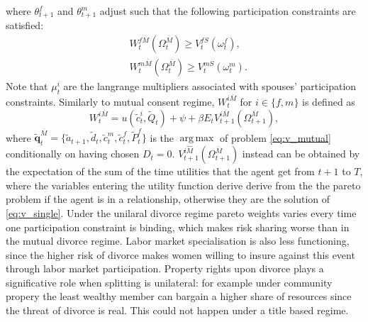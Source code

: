 \documentclass[12pt]{article}
\numberwithin{table}{section}
\DeclareMathOperator*{\argmax}{arg\,max}
\begin{document}
where $\theta^f_{t+1}$ and $\theta^m_{t+1}$ adjust such that the following participation constraints are satisfied:
\begin{equation}\label{eq:p_cons_mar}
\begin{split}
&
W^{f\overline{M}}_{t}(\Omega^{\overline{M}}_{t})\geq V_{t}^{fS}(\omega^f_{t}),\\ &
W^{m\overline{M}}_{t}(\Omega^{\overline{M}}_{t})\geq V_{t}^{mS}(\omega^m_{t}). 
\end{split}
\end{equation}
Note that $\mu^i_t$ are the langrange multipliers associated with spouses' participation constraints.
Similarly to mutual consent regime, $W_{t}^{i\overline{M}}$ for $i\in\{f,m\}$ is defined as 
\begin{equation}
W_{t}^{i\overline{M}}=u(\tilde{c}_t^{i},\tilde{Q}_t)+\psi+\beta E_t V_{t+1}^{i\overline{M}}(\Omega^{\overline{M}}_{t+1}),
\end{equation}
where
$\mathbf{\tilde{q}}^{\overline{M}}_t=\{\tilde{a}_{t+1},\tilde{d}_{t},\tilde{c}^{m}_{t},\tilde{c}^{f}_{t},\tilde{P}^{f}_t\}$ is the $\argmax$ of problem \eqref{eq:v_mutual} conditionally on having chosen $D_t=0$. $V_{t+1}^{i\hat{M}}(\Omega^{\overline{M}}_{t+1})$ instead can be obtained by the expectation of the sum of the time utilities that the agent get from $t+1$ to $T$, where the variables entering the utility function derive derive from the the pareto problem if the agent is in a relationship, otherwise they are the solution of \eqref{eq:v_single}.
Under the unilaral divorce regime pareto weights varies every time one participation constraint is binding, which makes risk sharing worse than in the mutual divorce regime. Labor market specialisation is also less functioning, since the higher risk of divorce makes women willing to insure against this event through labor market participation. Property rights upon divorce plays a significative role when splitting is unilateral: for example under community propery the least wealthy member can bargain a higher share of resources since the threat of divorce is real. This could not happen under a title based regime.
\end{document}
